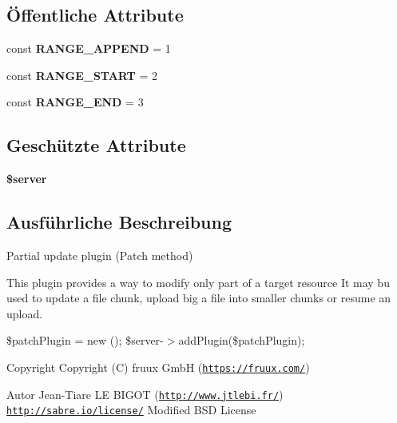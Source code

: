 \subsection*{Öffentliche Attribute}
\begin{DoxyCompactItemize}
\item 
\mbox{\label{class_sabre_1_1_d_a_v_1_1_partial_update_1_1_plugin_aa1ec3727d401044f5ddd72c0e7a8e677}} 
const {\bfseries R\+A\+N\+G\+E\+\_\+\+A\+P\+P\+E\+ND} = 1
\item 
\mbox{\label{class_sabre_1_1_d_a_v_1_1_partial_update_1_1_plugin_acad385dceee1b56e9dc33c522ded9ddb}} 
const {\bfseries R\+A\+N\+G\+E\+\_\+\+S\+T\+A\+RT} = 2
\item 
\mbox{\label{class_sabre_1_1_d_a_v_1_1_partial_update_1_1_plugin_ae58198e7029305267825d7c642adab52}} 
const {\bfseries R\+A\+N\+G\+E\+\_\+\+E\+ND} = 3
\end{DoxyCompactItemize}
\subsection*{Geschützte Attribute}
\begin{DoxyCompactItemize}
\item 
\mbox{\label{class_sabre_1_1_d_a_v_1_1_partial_update_1_1_plugin_a6bddb4264257939c5c5b29b88d1036fc}} 
{\bfseries \$server}
\end{DoxyCompactItemize}


\subsection{Ausführliche Beschreibung}
Partial update plugin (Patch method)

This plugin provides a way to modify only part of a target resource It may bu used to update a file chunk, upload big a file into smaller chunks or resume an upload.

\$patch\+Plugin = new (); \$server-\/$>$add\+Plugin(\$patch\+Plugin);

\begin{DoxyCopyright}{Copyright}
Copyright (C) fruux GmbH (\href{https://fruux.com/}{\tt https\+://fruux.\+com/}) 
\end{DoxyCopyright}
\begin{DoxyAuthor}{Autor}
Jean-\/\+Tiare LE B\+I\+G\+OT (\href{http://www.jtlebi.fr/}{\tt http\+://www.\+jtlebi.\+fr/})  \href{http://sabre.io/license/}{\tt http\+://sabre.\+io/license/} Modified B\+SD License 
\end{DoxyAuthor}


